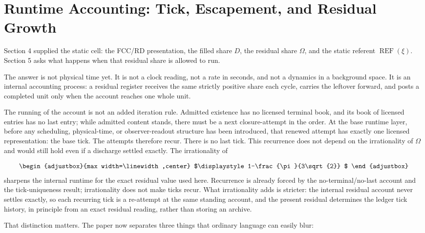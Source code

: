 \section{Runtime Accounting: Tick, Escapement, and Residual Growth}
\label{sec:05}
Section 4 supplied the static cell: the FCC/RD presentation, the filled share \(D\), the residual share \(\Omega\), and the static referent \(\operatorname{REF}(\xi)\). Section 5 asks what happens when that residual share is allowed to run.

The answer is not physical time yet. It is not a clock reading, not a rate in seconds, and not a dynamics in a background space. It is an internal accounting process: a residual register receives the same strictly positive share each cycle, carries the leftover forward, and posts a completed unit only when the account reaches one whole unit.

The running of the account is not an added iteration rule. Admitted existence has no licensed terminal book, and its book of licensed entries has no last entry; while admitted content stands, there must be a next closure-attempt in the order. At the base runtime layer, before any scheduling, physical-time, or observer-readout structure has been introduced, that renewed attempt has exactly one licensed representation: the base tick. The attempts therefore recur. There is no last tick. This recurrence does not depend on the irrationality of \(\Omega\) and would still hold even if a discharge settled exactly. The irrationality of

\begin{equation*}
\begin{adjustbox}{max width=\linewidth,center}
$\displaystyle
1-\frac{\pi}{3\sqrt{2}}
$
\end{adjustbox}
\end{equation*}
sharpens the internal runtime for the exact residual value used here. Recurrence is already forced by the no-terminal/no-last account and the tick-uniqueness result; irrationality does not make ticks recur. What irrationality adds is stricter: the internal residual account never settles exactly, so each recurring tick is a re-attempt at the same standing account, and the present residual determines the ledger tick history, in principle from an exact residual reading, rather than storing an archive.

That distinction matters. The paper now separates three things that ordinary language can easily blur:

